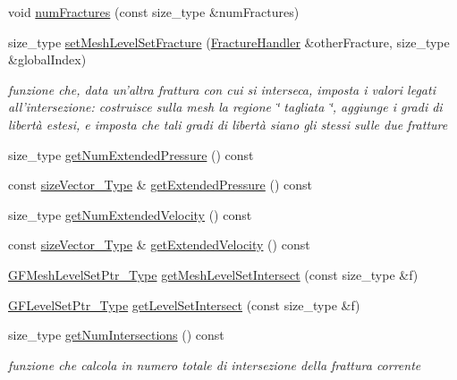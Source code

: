 \begin{DoxyCompactItemize}
\item 
void \hyperlink{classFractureHandler_a002e255a1976918ffbe6ea63b0fdae1b}{num\-Fractures} (const size\-\_\-type \&num\-Fractures)
\item 
size\-\_\-type \hyperlink{classFractureHandler_ae4204c592df2afe9c3dc6171f8bbb042}{set\-Mesh\-Level\-Set\-Fracture} (\hyperlink{classFractureHandler}{Fracture\-Handler} \&other\-Fracture, size\-\_\-type \&global\-Index)
\begin{DoxyCompactList}\small\item\em funzione che, data un'altra frattura con cui si interseca, imposta i valori legati all'intersezione\-: costruisce sulla mesh la regione \char`\"{} tagliata \char`\"{}, aggiunge i gradi di libertà estesi, e imposta che tali gradi di libertà siano gli stessi sulle due fratture \end{DoxyCompactList}\item 
size\-\_\-type \hyperlink{classFractureHandler_a585b1c169be23022e25e07bd9666d18d}{get\-Num\-Extended\-Pressure} () const 
\item 
const \hyperlink{Core_8h_a83c51913d041a5001e8683434c09857f}{size\-Vector\-\_\-\-Type} \& \hyperlink{classFractureHandler_a5d8a3c910ba9a5d156decb747040e41f}{get\-Extended\-Pressure} () const 
\item 
size\-\_\-type \hyperlink{classFractureHandler_af5b7cdadefe6993813e76fd6238b1771}{get\-Num\-Extended\-Velocity} () const 
\item 
const \hyperlink{Core_8h_a83c51913d041a5001e8683434c09857f}{size\-Vector\-\_\-\-Type} \& \hyperlink{classFractureHandler_acfb03361fe0e1060fdf07dd997065519}{get\-Extended\-Velocity} () const 
\item 
\hyperlink{Core_8h_a1cbde831f5a62206e084de1c5de27000}{G\-F\-Mesh\-Level\-Set\-Ptr\-\_\-\-Type} \hyperlink{classFractureHandler_a69b5921703089ac725df60b08eb821c1}{get\-Mesh\-Level\-Set\-Intersect} (const size\-\_\-type \&f)
\item 
\hyperlink{Core_8h_a036173458a8a25c7c03f8c76d97e9580}{G\-F\-Level\-Set\-Ptr\-\_\-\-Type} \hyperlink{classFractureHandler_a3c2efa9ded1347b095e2b3247e728894}{get\-Level\-Set\-Intersect} (const size\-\_\-type \&f)
\item 
size\-\_\-type \hyperlink{classFractureHandler_aa66dc3447c3bafc87e61f5b232c98acb}{get\-Num\-Intersections} () const 
\begin{DoxyCompactList}\small\item\em funzione che calcola in numero totale di intersezione della frattura corrente \end{DoxyCompactList}\item 

\end{DoxyCompactItemize}
